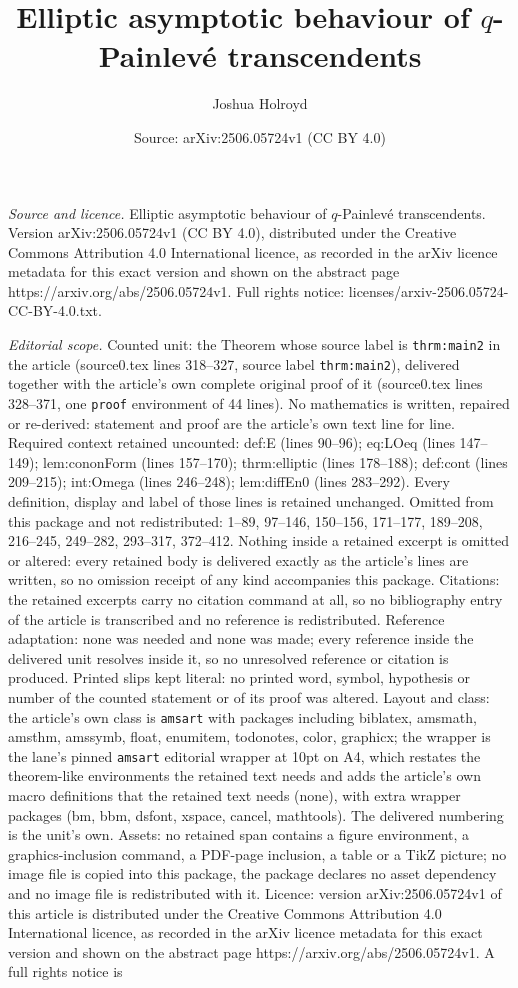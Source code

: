 \documentclass[10pt,a4paper]{amsart}
\title[Elliptic asymptotic behaviour of $q$-Painlev\'e transcendent]{Elliptic asymptotic behaviour of $q$-Painlev\'e transcendents}
\author{Joshua Holroyd}
\date{Source: arXiv:2506.05724v1 (CC BY 4.0)}
\begin{document}
\maketitle

\noindent\emph{Source and licence.} Elliptic asymptotic behaviour of $q$-Painlev\'e transcendents. Version arXiv:2506.05724v1 (CC BY 4.0), distributed under the Creative Commons Attribution 4.0 International licence, as recorded in the arXiv licence metadata for this exact version and shown on the abstract page https://arxiv.org/abs/2506.05724v1. Full rights notice: licenses/arxiv-2506.05724-CC-BY-4.0.txt.\par\smallskip

\noindent\textit{Editorial scope.} Counted unit: the Theorem whose source label is \texttt{thrm:main2} in the article (source0.tex lines 318--327, source label \texttt{thrm:main2}), delivered together with the article's own complete original proof of it (source0.tex lines 328--371, one \texttt{proof} environment of 44 lines). No mathematics is written, repaired or re-derived: statement and proof are the article's own text line for line. Required context retained uncounted: def:E (lines 90--96); eq:LOeq (lines 147--149); lem:cononForm (lines 157--170); thrm:elliptic (lines 178--188); def:cont (lines 209--215); int:Omega (lines 246--248); lem:diffEn0 (lines 283--292). Every definition, display and label of those lines is retained unchanged. Omitted from this package and not redistributed: 1--89, 97--146, 150--156, 171--177, 189--208, 216--245, 249--282, 293--317, 372--412. Nothing inside a retained excerpt is omitted or altered: every retained body is delivered exactly as the article's lines are written, so no omission receipt of any kind accompanies this package. Citations: the retained excerpts carry no citation command at all, so no bibliography entry of the article is transcribed and no reference is redistributed. Reference adaptation: none was needed and none was made; every reference inside the delivered unit resolves inside it, so no unresolved reference or citation is produced. Printed slips kept literal: no printed word, symbol, hypothesis or number of the counted statement or of its proof was altered. Layout and class: the article's own class is \texttt{amsart} with packages including biblatex, amsmath, amsthm, amssymb, float, enumitem, todonotes, color, graphicx; the wrapper is the lane's pinned \texttt{amsart} editorial wrapper at 10pt on A4, which restates the theorem-like environments the retained text needs and adds the article's own macro definitions that the retained text needs (none), with extra wrapper packages (bm, bbm, dsfont, xspace, cancel, mathtools). The delivered numbering is the unit's own. Assets: no retained span contains a figure environment, a graphics-inclusion command, a PDF-page inclusion, a table or a TikZ picture; no image file is copied into this package, the package declares no asset dependency and no image file is redistributed with it. Licence: version arXiv:2506.05724v1 of this article is distributed under the Creative Commons Attribution 4.0 International licence, as recorded in the arXiv licence metadata for this exact version and shown on the abstract page https://arxiv.org/abs/2506.05724v1. A full rights notice is 
\end{document}

